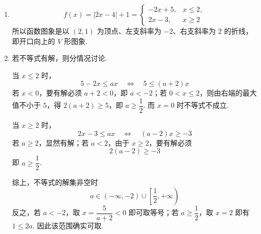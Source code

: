 \begin{solution}
\begin{enumerate}
\item
\[
f(x)=|2x-4|+1=
\begin{cases}
-2x+5,&x\leqslant2,\\
2x-3,&x\geqslant2
\end{cases}
\]
所以函数图象是以 \((2,1)\) 为顶点、左支斜率为 \(-2\)、右支斜率为 \(2\) 的折线，即开口向上的 \(V\) 形图象.

\item 若不等式有解，则分情况讨论.

当 \(x\leqslant2\) 时，
\[
5-2x\leqslant ax\quad\Longleftrightarrow\quad 5\leqslant(a+2)x
\]
若 \(x<0\)，要有解必须 \(a+2<0\)，即 \(a<-2\)；若 \(0<x\leqslant2\)，则由右端的最大值不小于 \(5\)，得 \(2(a+2)\geqslant5\)，即 \(a\geqslant\dfrac12\). 而 \(x=0\) 时不等式不成立.

当 \(x\geqslant2\) 时，
\[
2x-3\leqslant ax\quad\Longleftrightarrow\quad (a-2)x\geqslant-3
\]
若 \(a\geqslant2\)，显然有解；若 \(a<2\)，由于 \(x\geqslant2\)，要有解必须
\[
2(a-2)\geqslant-3
\]
即 \(a\geqslant\dfrac12\).

综上，不等式的解集非空时
\[
a\in\left(-\infty,-2\right)\cup\left[\frac12,+\infty\right)
\]
反之，若 \(a<-2\)，取 \(x=\dfrac{5}{a+2}<0\) 即可取等号；若 \(a\geqslant\dfrac12\)，取 \(x=2\) 即有 \(1\leqslant2a\). 因此该范围确实可取.
\end{enumerate}
\end{solution}
